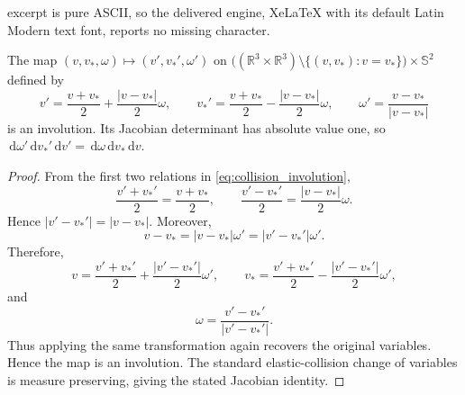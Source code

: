 \documentclass[10pt,a4paper]{amsart}
\newcommand{\R}{\mathbb{R}}
\newcommand{\Sph}{\mathbb{S}^{2}}
\newcommand{\dd}{\,\mathrm{d}}
\begin{document}
excerpt is pure ASCII, so the delivered engine, XeLaTeX with its default Latin Modern text font, reports no missing character.
\begin{lemma}
The map
$(v,v_*,\omega)\mapsto (v',v_*',\omega')$ on
$\big((\R^3\times\R^3)\setminus\{(v,v_*):v=v_*\}\big)\times\Sph$ defined by
\begin{equation}
v'=\frac{v+v_*}{2}+\frac{|v-v_*|}{2}\omega,
\qquad
v_*'=\frac{v+v_*}{2}-\frac{|v-v_*|}{2}\omega,
\qquad
\omega'=\frac{v-v_*}{|v-v_*|}
\label{eq:collision_involution}
\end{equation}
is an involution. Its Jacobian determinant has absolute value one, so $\dd\omega'\dd v_*'\dd v'=\dd\omega\dd v_*\dd v$.
\end{lemma}

\begin{proof}
From the first two relations in \eqref{eq:collision_involution},
\[
\frac{v'+v_*'}{2}=\frac{v+v_*}{2},
\qquad
\frac{v'-v_*'}{2}=\frac{|v-v_*|}{2}\omega.
\]
Hence $|v'-v_*'|=|v-v_*|$. Moreover,
\[
v-v_*=|v-v_*|\omega'=|v'-v_*'|\omega'.
\]
Therefore,
\[
v=\frac{v'+v_*'}{2}+\frac{|v'-v_*'|}{2}\omega',
\qquad
v_*=\frac{v'+v_*'}{2}-\frac{|v'-v_*'|}{2}\omega',
\]
and
\[
\omega=\frac{v'-v_*'}{|v'-v_*'|}.
\]
Thus applying the same transformation again recovers the original variables. Hence the map is an involution. The standard elastic-collision change of variables is measure preserving, giving the stated Jacobian identity.
\end{proof}
\end{document}
